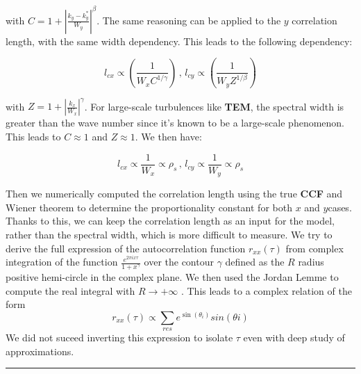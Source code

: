 \documentclass[11pt,a4paper,openany]{report}
\begin{document}
\begin{multicols}{2}
    with $ C = 1 + \left| \frac{k_y - k_y^*}{W_y} \right|^\beta $. The same reasoning can be applied to the \( y \) correlation length, with the same width dependency. This leads to the following dependency:

    $$
        l_{cx} \propto \left(\frac{1}{W_x C^{1/ \gamma}}\right) \, ,\, l_{cy} \propto \left(\frac{1}{W_y Z^{1/ \beta}}\right)
    $$

    with $ Z = 1 + \left| \frac{k_x}{W_x} \right|^\gamma $. For large-scale turbulences like \textbf{TEM}, the spectral width is greater than the wave number since it's known to be a large-scale phenomenon. This leads to $ C \approx 1 $ and $ Z \approx 1 $. We then have:

    $$
        l_{cx} \propto \frac{1}{W_x}  \propto \rho_s \, ,\, l_{cy} \propto \frac{1}{W_y} \propto \rho_s
    $$

    Then we numerically computed the correlation length using the true \textbf{CCF} and Wiener theorem to determine the proportionality constant for both $ x $ and $ y $cases. Thanks to this, we can keep the correlation length as an input for the model, rather than the spectral width, which is more difficult to measure. We try to derive the full expression of the autocorrelation function $r_{xx}(\tau)$ from complex integration of the function $\frac{e^{2\pi ix \tau}}{1 + x^\gamma}$ over the contour $\gamma$ defined as the $R$ radius positive hemi-circle in the complex plane. We then used the Jordan Lemme to compute the real integral with $R \rightarrow +\infty$ . This leads to a complex relation of the form $$r_{x x}(\tau) \propto \sum_{res} e^{\sin(\theta_i)}sin(\theta i) $$ We did not suceed inverting this expression to isolate $\tau$ even with deep study of approximations.
\end{multicols}
\noindent
\rule{\linewidth}{0.4pt}
\end{document}
